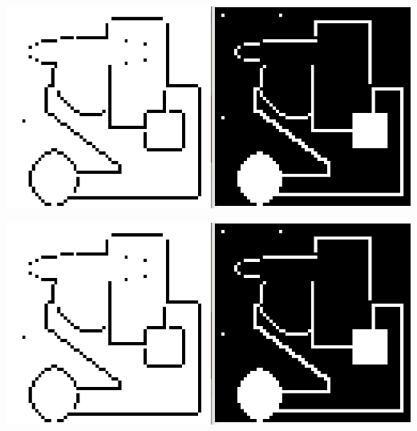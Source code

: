 \begin{multicols}{2}
\lipsum[10] 

\begin{Figure}
 \centering
\includegraphics[width=\linewidth]{./Experiments/Template/fig/fig2.png}
\end{Figure}

\lipsum[1]

\begin{Figure}
 \centering
\includegraphics[width=\linewidth]{./Experiments/Template/fig/fig2.png}
\end{Figure}

\lipsum[1]
\end{multicols}